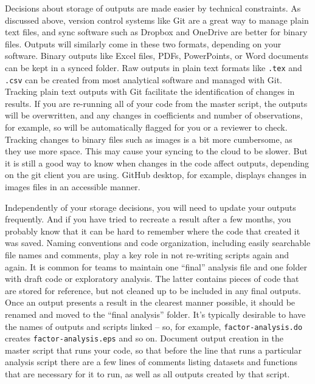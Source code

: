 Decisions about storage of outputs are made easier by technical constraints.
As discussed above, version control systems like Git are a great way to manage
plain text files, and sync software such as Dropbox and OneDrive are better for binary files.
Outputs will similarly come in these two formats, depending on your software.
Binary outputs like Excel files, PDFs, PowerPoints, or Word documents can be kept in a synced folder.
Raw outputs in plain text formats like \texttt{.tex} and \texttt{.csv}
can be created from most analytical software and managed with Git.
Tracking plain text outputs with Git facilitate the identification of changes in results.
If you are re-running all of your code from the master script,
the outputs will be overwritten,
and any changes in coefficients and number of observations, for example, so
will be automatically flagged for you or a reviewer to check.
Tracking changes to binary files such as images is a bit more cumbersome, as they use more space.
This may cause your syncing to the cloud to be slower.
But it is still a good way to know when changes in the code affect outputs,
depending on the git client you are using.
GitHub desktop, for example, displays changes in images files in an accessible manner.

Independently of your storage decisions,
you will need to update your outputs frequently.
And if you have tried to recreate a result after a few months,
you probably know that it can be hard to remember where the code that created it was saved.
Naming conventions and code organization,
including easily searchable file names and comments,
play a key role in not re-writing scripts again and again.
It is common for teams to maintain one ``final'' analysis file
and one folder with draft code or exploratory analysis.
The latter contains pieces of code that are stored for reference,
but not cleaned up to be included in any final outputs.
Once an output presents a result in the clearest manner possible,
it should be renamed and moved to the ``final analysis'' folder.
It's typically desirable to have the names of outputs and scripts linked --
so, for example, \texttt{factor-analysis.do} creates \texttt{factor-analysis.eps} and so on.
Document output creation in the master script that runs your code,
so that before the line that runs a particular analysis script
there are a few lines of comments listing
datasets and functions that are necessary for it to run,
as well as all outputs created by that script.

